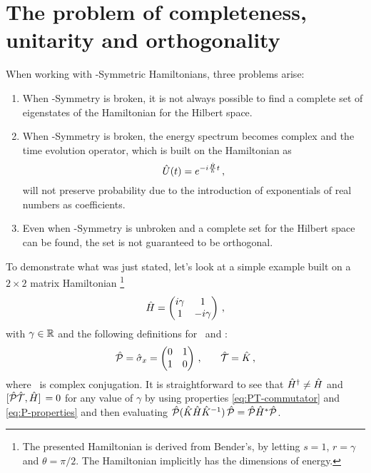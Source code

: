     \section{The problem of completeness, unitarity and orthogonality}
        When working with \PT-Symmetric Hamiltonians, three problems arise:
        \begin{enumerate}[label = \mybullet]
            \item When \PT-Symmetry is broken, it is not always possible to find a complete set of eigenstates of the Hamiltonian for the Hilbert space.
            \item When \PT-Symmetry is broken, the energy spectrum becomes complex and the time evolution operator, which is built on the Hamiltonian as 
            \begin{equation}
                \label{eq:time-evolution}
                \hU\pqty{t} = \myexp{-i\frac{\hH}{\hbar}t}
                \mycomma
            \end{equation}
            will not preserve probability due to the introduction of exponentials of real numbers as coefficients.
            \item Even when \PT-Symmetry is unbroken and a complete set for the Hilbert space can be found, the set is not guaranteed to be orthogonal.
        \end{enumerate}
        To demonstrate what was just stated, let's look at a simple example built on a $2\times2$ matrix Hamiltonian \cite{Bender2005,Bender2007}\footnote{The presented Hamiltonian is derived from Bender's, by letting $s = 1$, $r = \gamma$ and $\theta = \pi/2$. The Hamiltonian implicitly has the dimensions of energy.}
        \begin{equation}
            \label{eq:ex:reduced-2x2-hamiltonian}
            \hH = \pmqty{\dmat[1]{i\gamma, -i\gamma}}
            \mycomma
        \end{equation}
        with $\gamma\in\mathbb{R}$ and the following definitions for \hP\ and \hT :
        \begin{equation}
            \label{eq:ex:reduced-2x2-P-T}
            \hP = \hat{\sigma}_x = \pmqty{\admat[0]{1,1}}
            \mycomma\qquad
            \hT = \hK
            \mycomma
        \end{equation}
        where \hK\ is complex conjugation. It is straightforward to see that $\hat{H}^\dag \neq \hat{H}$ and $\comm*{\hPT}{\hH} = 0$ for any value of $\gamma$ by using properties \eqref{eq:PT-commutator} and \eqref{eq:P-properties} and then evaluating $\hP\pqty*{\hK\hH\hK^{-1}}\hP = \hP\hH^*\hP$.
        
